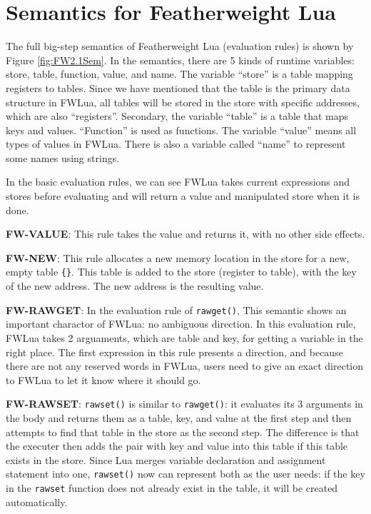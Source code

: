 \section{Semantics for Featherweight Lua}\label{sec: FWLUAsemantic}
The full big-step semantics of Featherweight Lua (evaluation rules) is shown by Figure \ref{fig:FW2.1Sem}. In the semantics, there are 5 kinds of runtime variables: store, table, function, value, and name. The variable ``store'' is a table mapping registers to tables. Since we have mentioned that the table is the primary data structure in FWLua, all tables will be stored in the store with specific addresses, which are also ``registers''. Secondary, the variable ``table'' is a table that maps keys and values. ``Function'' is used as functions. The variable ``value'' means all types of values in FWLua. There is also a variable called ``name'' to represent some names using strings.

In the basic evaluation rules, we can see FWLua takes current expressions and stores before evaluating and will return a value and manipulated store when it is done.

{\bf FW-VALUE}: This rule takes the value and returns it, with no other side effects.

{\bf FW-NEW}: This rule allocates a new memory location in the store for a new, empty table {\tt \{\}}. This table is added to the store (register to table), with the key of the new address.  The new address is the resulting value.

{\bf FW-RAWGET}: In the evaluation rule of {\tt rawget()},
This semantic shows an important charactor of FWLua: no ambiguous direction. In this evaluation rule, FWLua takes 2 arguaments, which are table and key, for getting a variable in the right place. The first expression in this rule presents a direction, and because there are not any reserved words in FWLua, users need to give an exact direction to FWLua to let it know where it should go.

{\bf FW-RAWSET}: {\tt rawset()} is similar to {\tt rawget()}: it evaluates its 3 arguments in the body and returns them as a table, key, and value at the first step and then attempts to find that table in the store as the second step. The difference is that the executer then adds the pair with key and value into this table if this table exists in the store. Since Lua merges variable declaration and assignment statement into one, {\tt rawset()} now can represent both as the user needs: if the key in the {\tt rawset} function does not already exist in the table, it will be created automatically.

